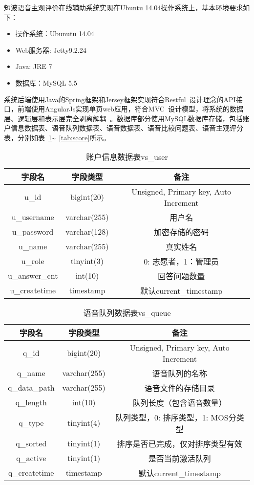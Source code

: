 短波语音主观评价在线辅助系统实现在Ubuntu 14.04操作系统上，基本环境要求如下：
\begin{itemize}
    \item 操作系统：Ubunutu 14.04
    \item Web服务器: Jetty9.2.24
    \item Java: JRE 7
    \item 数据库：MySQL 5.5
\end{itemize}

系统后端使用Java的Spring框架和Jersey框架实现符合Restful~\cite{fielding2000rest}设计理念的API接口，前端使用AngularJs实现单页web应用，符合MVC~\cite{leff2001web}设计模型，将系统的数据层、逻辑层和表示层完全剥离解耦~\cite{burbeck87}。数据库部分使用MySQL数据库存储，包括账户信息数据表、语音队列数据表、语音数据表、语音比较问题表、语音主观评分表，分别如表~\ref{tab:user}\~~\ref{tab:score}所示。

\begin{table}
\centering
\caption{账户信息数据表vs\_user}
\label{tab:user}
\begin{tabular}{ccc}
\toprule[1.5pt]
字段名 & 字段类型 & 备注 \\ \midrule[1pt]
u\_id & bigint(20) & Unsigned, Primary key, Auto Increment \\
u\_username & varchar(255) & 用户名 \\
u\_password & varchar(128) & 加密存储的密码 \\
u\_name & varchar(255) & 真实姓名 \\
u\_role & tinyint(3) & 0: 志愿者，1：管理员 \\
u\_answer\_cnt & int(10) & 回答问题数量 \\
u\_createtime & timestamp & 默认current\_timestamp \\ \bottomrule[1.5pt]
\end{tabular}
\end{table}

\begin{table}
\centering
\caption{语音队列数据表vs\_queue}
\label{tab:queue}
\begin{tabular}{ccc}
\toprule[1.5pt]
字段名 & 字段类型 & 备注 \\ \midrule[1pt]
q\_id & bigint(20) & Unsigned, Primary key, Auto Increment \\
q\_name & varchar(255) & 语音队列的名称 \\
q\_data\_path & varchar(255) & 语音文件的存储目录 \\
q\_length & int(10) & 队列长度（包含语音数量） \\
q\_type & tinyint(4) & 队列类型，0: 排序类型，1: MOS分类型 \\
q\_sorted & tinyint(1) & 排序是否已完成，仅对排序类型有效 \\
q\_active & tinyint(1) & 是否当前激活队列 \\
q\_createtime & timestamp & 默认current\_timestamp \\ \bottomrule[1.5pt]
\end{tabular}
\end{table}

